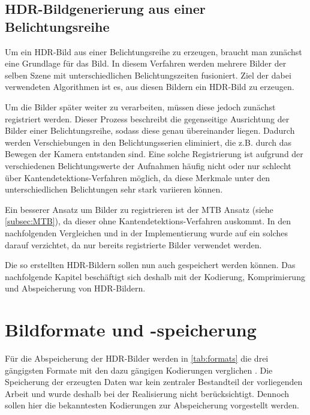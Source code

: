 \subsection{HDR-Bildgenerierung aus einer Belichtungsreihe}
\label{sub:belichtungsreihe}
Um ein \gls{HDR}-Bild aus einer Belichtungsreihe zu erzeugen, braucht man zunächst eine Grundlage für das Bild. In diesem Verfahren werden mehrere Bilder der selben Szene mit unterschiedlichen Belichtungszeiten fusioniert. Ziel der dabei verwendeten Algorithmen ist es, aus diesen Bildern ein \gls{HDR}-Bild zu erzeugen.

Um die Bilder später weiter zu verarbeiten, müssen diese jedoch zunächst registriert werden. Dieser Prozess beschreibt die gegenseitige Ausrichtung der Bilder einer Belichtungsreihe, sodass diese genau übereinander liegen. Dadurch werden Verschiebungen in den Belichtungsserien eliminiert, die z.B. durch das Bewegen der Kamera entstanden sind. Eine solche Registrierung ist aufgrund der verschiedenen Belichtungswerte der Aufnahmen häufig nicht oder nur schlecht über Kantendetektions-Verfahren möglich, da diese Merkmale unter den unterschiedlichen Belichtungen sehr stark variieren können.

Ein besserer Ansatz um Bilder zu registrieren ist der \gls{MTB} Ansatz (siehe \autoref{subsec:MTB}), da dieser ohne Kantendetektions-Verfahren auskommt. In den nachfolgenden Vergleichen und in der Implementierung wurde auf ein solches darauf verzichtet, da nur bereits registrierte Bilder verwendet werden.


Die so erstellten \gls{HDR}-Bildern sollen nun auch gespeichert werden können. Das nachfolgende Kapitel beschäftigt sich deshalb mit der Kodierung, Komprimierung und Abspeicherung von \gls{HDR}-Bildern.



\section{Bildformate und -speicherung}

Für die Abspeicherung der \gls{HDR}-Bilder werden in \autoref{tab:formats} die drei gängigsten Formate mit den dazu gängigen Kodierungen verglichen \cite[S.~89]{Reinhard}. Die Speicherung der erzeugten Daten war kein zentraler Bestandteil der vorliegenden Arbeit und wurde deshalb bei der Realisierung nicht berücksichtigt. Dennoch sollen hier die bekanntesten Kodierungen zur Abspeicherung vorgestellt werden.


